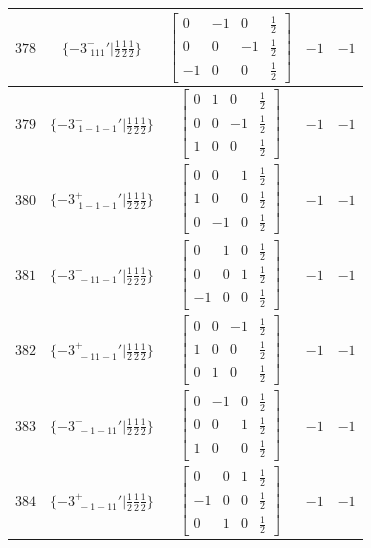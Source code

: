 \documentclass[fleqn,8pt]{jsarticle}
\begin{document}
\begin{longtable}{ccccc}
$ 378 $ & $ \{-3^{-}_{\,\,111}{}'|\frac{1}{2} \frac{1}{2} \frac{1}{2}\} $ & $ \begin{bmatrix} 0 & -1 & 0 & \frac{1}{2} \\ 0 & 0 & -1 & \frac{1}{2} \\ -1 & 0 & 0 & \frac{1}{2} \end{bmatrix} $ & $ -1 $ & $ -1 $ \\ \hline
$ 379 $ & $ \{-3^{-}_{\,\,1-1-1}{}'|\frac{1}{2} \frac{1}{2} \frac{1}{2}\} $ & $ \begin{bmatrix} 0 & 1 & 0 & \frac{1}{2} \\ 0 & 0 & -1 & \frac{1}{2} \\ 1 & 0 & 0 & \frac{1}{2} \end{bmatrix} $ & $ -1 $ & $ -1 $ \\ \hline
$ 380 $ & $ \{-3^{+}_{\,\,1-1-1}{}'|\frac{1}{2} \frac{1}{2} \frac{1}{2}\} $ & $ \begin{bmatrix} 0 & 0 & 1 & \frac{1}{2} \\ 1 & 0 & 0 & \frac{1}{2} \\ 0 & -1 & 0 & \frac{1}{2} \end{bmatrix} $ & $ -1 $ & $ -1 $ \\ \hline
$ 381 $ & $ \{-3^{-}_{\,\,-11-1}{}'|\frac{1}{2} \frac{1}{2} \frac{1}{2}\} $ & $ \begin{bmatrix} 0 & 1 & 0 & \frac{1}{2} \\ 0 & 0 & 1 & \frac{1}{2} \\ -1 & 0 & 0 & \frac{1}{2} \end{bmatrix} $ & $ -1 $ & $ -1 $ \\ \hline
$ 382 $ & $ \{-3^{+}_{\,\,-11-1}{}'|\frac{1}{2} \frac{1}{2} \frac{1}{2}\} $ & $ \begin{bmatrix} 0 & 0 & -1 & \frac{1}{2} \\ 1 & 0 & 0 & \frac{1}{2} \\ 0 & 1 & 0 & \frac{1}{2} \end{bmatrix} $ & $ -1 $ & $ -1 $ \\ \hline
$ 383 $ & $ \{-3^{-}_{\,\,-1-11}{}'|\frac{1}{2} \frac{1}{2} \frac{1}{2}\} $ & $ \begin{bmatrix} 0 & -1 & 0 & \frac{1}{2} \\ 0 & 0 & 1 & \frac{1}{2} \\ 1 & 0 & 0 & \frac{1}{2} \end{bmatrix} $ & $ -1 $ & $ -1 $ \\ \hline
$ 384 $ & $ \{-3^{+}_{\,\,-1-11}{}'|\frac{1}{2} \frac{1}{2} \frac{1}{2}\} $ & $ \begin{bmatrix} 0 & 0 & 1 & \frac{1}{2} \\ -1 & 0 & 0 & \frac{1}{2} \\ 0 & 1 & 0 & \frac{1}{2} \end{bmatrix} $ & $ -1 $ & $ -1 $ \\
\end{longtable}
\end{document}

